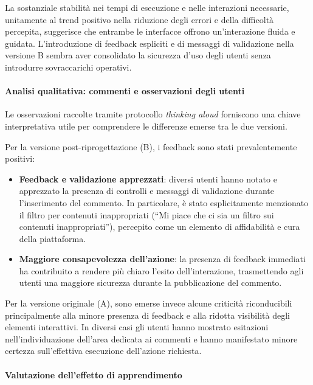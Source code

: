 La sostanziale stabilità nei tempi di esecuzione e nelle interazioni necessarie, unitamente al trend positivo nella riduzione degli errori e della difficoltà percepita, suggerisce che entrambe le interfacce offrono un'interazione fluida e guidata. L'introduzione di feedback espliciti e di messaggi di validazione nella versione B sembra aver consolidato la sicurezza d'uso degli utenti senza introdurre sovraccarichi operativi.

\paragraph{Analisi qualitativa: commenti e osservazioni degli utenti}

Le osservazioni raccolte tramite protocollo \textit{thinking aloud} forniscono una chiave interpretativa utile per comprendere le differenze emerse tra le due versioni.

Per la versione post-riprogettazione (B), i feedback sono stati prevalentemente positivi:

\begin{itemize}
	\item \textbf{Feedback e validazione apprezzati}: diversi utenti hanno notato e apprezzato la presenza di controlli e messaggi di validazione durante l'inserimento del commento. In particolare, è stato esplicitamente menzionato il filtro per contenuti inappropriati (``Mi piace che ci sia un filtro sui contenuti inappropriati''), percepito come un elemento di affidabilità e cura della piattaforma.

	\item \textbf{Maggiore consapevolezza dell'azione}: la presenza di feedback immediati ha contribuito a rendere più chiaro l'esito dell'interazione, trasmettendo agli utenti una maggiore sicurezza durante la pubblicazione del commento.
\end{itemize}

Per la versione originale (A), sono emerse invece alcune criticità riconducibili principalmente alla minore presenza di feedback e alla ridotta visibilità degli elementi interattivi. In diversi casi gli utenti hanno mostrato esitazioni nell'individuazione dell'area dedicata ai commenti e hanno manifestato minore certezza sull'effettiva esecuzione dell'azione richiesta.

\paragraph{Valutazione dell’effetto di apprendimento}

